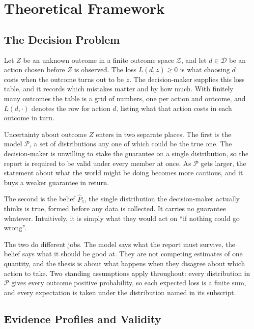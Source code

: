 \section{Theoretical Framework}\label{sec:decision}

\subsection{The Decision Problem}\label{sec:problem}

Let $Z$ be an unknown outcome in a finite outcome space $\mathcal Z$, and let
$d\in\mathcal D$ be an action chosen before $Z$ is observed. The loss
$L(d,z)\geq0$ is what choosing $d$ costs when the outcome turns out to be $z$.
The decision-maker supplies this loss table, and it records which mistakes
matter and by how much. With finitely many outcomes the table is a grid of
numbers, one per action and outcome, and $L(d,\cdot)$ denotes the row for
action $d$, listing what that action costs in each outcome in turn.

Uncertainty about outcome $Z$ enters in two separate places. The first is the model $\mathcal P$, a set of distributions any one of which
could be the true one. The decision-maker is unwilling to stake the guarantee
on a single distribution, so the report is required to be valid under every
member at once. As $\mathcal P$ gets larger, the statement about what
the world might be doing becomes more cautious, and it buys a weaker guarantee in return.

The second is the belief $\widehat P_1$, the single distribution the
decision-maker actually thinks is true, formed before any data is collected.
It carries no guarantee whatever. Intuitively, it is simply what they would act on ``if
nothing could go wrong''.

The two do different jobs. The model says what the report must survive, the
belief says what it should be good at. They are not competing estimates of one
quantity, and the thesis is about what happens when they disagree about which
action to take. Two standing assumptions apply throughout: every distribution
in $\mathcal P$ gives every outcome positive probability, so each expected
loss is a finite sum, and every expectation is taken under the distribution
named in its subscript.

\subsection{Evidence Profiles and Validity}\label{sec:evar}

